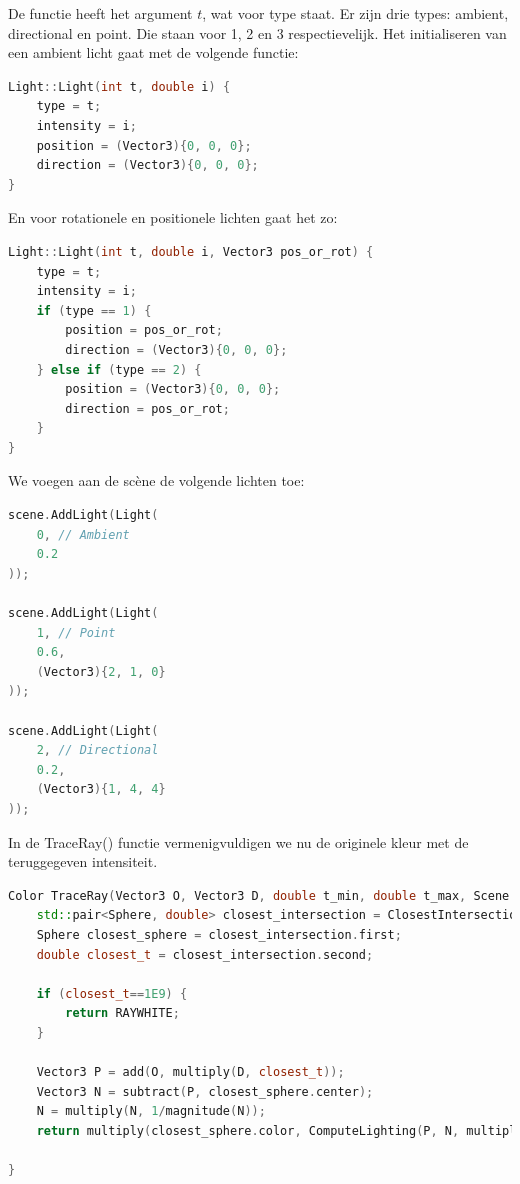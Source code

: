 \documentclass[12pt, a4paper]{article}
\begin{document}
De functie heeft het argument $t$, wat voor type staat. Er zijn drie types: ambient, directional en point. Die staan voor 1, 2 en 3 respectievelijk. Het initialiseren van een ambient licht gaat met de volgende functie:

\begin{lstlisting}[language=C++]
Light::Light(int t, double i) {
    type = t;
    intensity = i;
    position = (Vector3){0, 0, 0};
    direction = (Vector3){0, 0, 0};
}
\end{lstlisting}

En voor rotationele en positionele lichten gaat het zo:

\begin{lstlisting}[language=C++]
Light::Light(int t, double i, Vector3 pos_or_rot) {
    type = t;
    intensity = i;
    if (type == 1) {
        position = pos_or_rot;
        direction = (Vector3){0, 0, 0};
    } else if (type == 2) {
        position = (Vector3){0, 0, 0};
        direction = pos_or_rot;
    }
}
\end{lstlisting}

We voegen aan de scène de volgende lichten toe:

\begin{lstlisting}[language=C++]
scene.AddLight(Light(
    0, // Ambient
    0.2
));

scene.AddLight(Light(
    1, // Point
    0.6,
    (Vector3){2, 1, 0}
));

scene.AddLight(Light(
    2, // Directional
    0.2,
    (Vector3){1, 4, 4}
));
\end{lstlisting}

In de TraceRay() functie vermenigvuldigen we nu de originele kleur met de teruggegeven intensiteit. 

\begin{lstlisting}[language=C++]
Color TraceRay(Vector3 O, Vector3 D, double t_min, double t_max, Scene scene) {   
    std::pair<Sphere, double> closest_intersection = ClosestIntersection(O, D, t_min, t_max, scene);
    Sphere closest_sphere = closest_intersection.first;
    double closest_t = closest_intersection.second;

    if (closest_t==1E9) {
        return RAYWHITE;
    }

    Vector3 P = add(O, multiply(D, closest_t));
    Vector3 N = subtract(P, closest_sphere.center);
    N = multiply(N, 1/magnitude(N));
    return multiply(closest_sphere.color, ComputeLighting(P, N, multiply(D, -1), scene));

}
\end{lstlisting}
\end{document}
